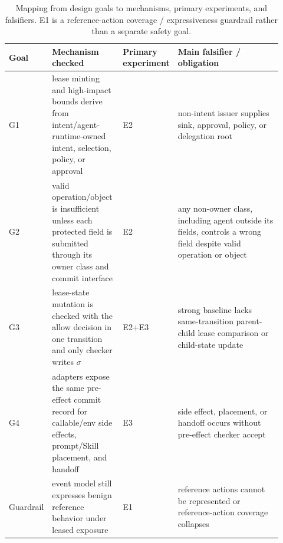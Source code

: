 \documentclass[UTF8,a4paper,11pt]{ctexart}
\begin{document}
\begin{table}[t]
\centering
\scriptsize
\setlength{\tabcolsep}{1pt}
\caption{Mapping from design goals to mechanisms, primary experiments, and falsifiers. E1 is a reference-action coverage / expressiveness guardrail rather than a separate safety goal.}
\label{tab:goal-map}
\begin{tabular}{p{0.08\linewidth}p{0.26\linewidth}p{0.17\linewidth}p{0.41\linewidth}}
\toprule
Goal & Mechanism checked & Primary experiment & Main falsifier / obligation \\
\midrule
G1 & lease minting and high-impact bounds derive from intent/agent-runtime-owned intent, selection, policy, or approval & E2 & non-intent issuer supplies sink, approval, policy, or delegation root \\
G2 & valid operation/object is insufficient unless each protected field is submitted through its owner class and commit interface & E2 & any non-owner class, including agent outside its fields, controls a wrong field despite valid operation or object \\
G3 & lease-state mutation is checked with the allow decision in one transition and only checker writes \(\sigma\) & E2+E3 & strong baseline lacks same-transition parent-child lease comparison or child-state update \\
G4 & adapters expose the same pre-effect commit record for callable/env side effects, prompt/Skill placement, and handoff & E3 & side effect, placement, or handoff occurs without pre-effect checker accept \\
Guardrail & event model still expresses benign reference behavior under leased exposure & E1 & reference actions cannot be represented or reference-action coverage collapses \\
\bottomrule
\end{tabular}
\end{table}
\end{document}
